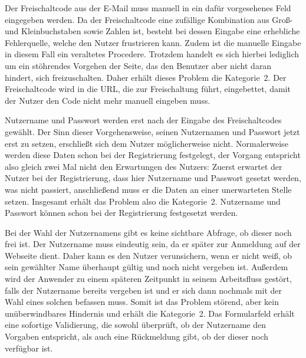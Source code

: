 {
Der Freischaltcode aus der E\hbox{-}Mail muss manuell in ein dafür vorgesehenes Feld eingegeben werden.
}
{
Da der Freischaltcode eine zufällige Kombination aus Groß- und Kleinbuchstaben sowie Zahlen ist, besteht bei dessen Eingabe eine erhebliche Fehlerquelle, welche den Nutzer frustrieren kann. Zudem ist die manuelle Eingabe in diesem Fall ein veraltetes Procedere. Trotzdem handelt es sich hierbei lediglich um ein stöhrendes Vorgehen der Seite, das den Benutzer aber nicht daran hindert, sich freizuschalten. Daher erhält dieses Problem die Kategorie~2.
}
{
Der Freischaltcode wird in die URL, die zur Freischaltung führt, eingebettet, damit der Nutzer den Code nicht mehr manuell eingeben muss.
}
\label{prob:frei:codeeingabe}

{
Nutzername und Passwort werden erst nach der Eingabe des Freischaltcodes gewählt. 
}
{
Der Sinn dieser Vorgehensweise, seinen Nutzernamen und Passwort jetzt erst zu setzen, erschließt sich dem Nutzer möglicherweise nicht. Normalerweise werden diese Daten schon bei der Registrierung festgelegt, der Vorgang entspricht also gleich zwei Mal nicht den Erwartungen des Nutzers: Zuerst erwartet der Nutzer bei der Registrierung, dass hier Nutzername und Passwort gesetzt werden, was nicht passiert, anschließend muss er die Daten an einer unerwarteten Stelle setzen. Insgesamt erhält das Problem also die Kategorie~2.
}
{
Nutzername und Passwort können schon bei der Registrierung festgesetzt werden.
}
\label{prob:frei:nutzerundpw}

{
Bei der Wahl der Nutzernamens gibt es keine sichtbare Abfrage, ob dieser noch frei ist.
}
{
Der Nutzername muss eindeutig sein, da er später zur Anmeldung auf der Webseite dient. Daher kann es den Nutzer verunsichern, wenn er nicht weiß, ob sein gewählter Name überhaupt gültig und noch nicht vergeben ist. Außerdem wird der Anwender zu einem späteren Zeitpunkt in seinem Arbeitsfluss gestört, falls der Nutzername bereits vergeben ist und er sich dann nochmals mit der Wahl eines solchen befassen muss. Somit ist das Problem störend, aber kein unüberwindbares Hindernis und erhält die Kategorie~2.
}
{
Das Formularfeld erhält eine sofortige Validierung, die sowohl überprüft, ob der Nutzername den Vorgaben entspricht, als auch eine Rückmeldung gibt, ob der dieser noch verfügbar ist.
}
\label{prob:frei:nutzerverfuegbar}

